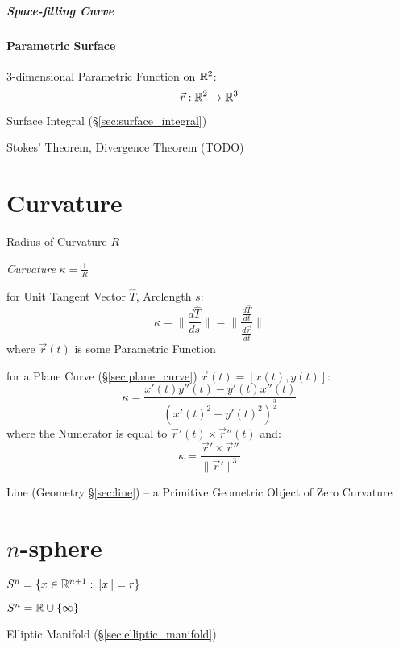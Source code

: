 \subparagraph{Space-filling Curve}\label{sec:space_filling_curve}\hfill



\paragraph{Parametric Surface}\label{sec:parametric_surface}\hfill

3-dimensional Parametric Function on
$\mathbb{R}^2$:
\[
  \vec{r} : \mathbb{R}^2 \rightarrow \mathbb{R}^3
\]

Surface Integral (\S\ref{sec:surface_integral})

Stokes' Theorem, Divergence Theorem (TODO)



\section{Curvature}\label{sec:curvature}

Radius of Curvature $R$

\emph{Curvature} $\kappa = \frac{1}{R}$

for Unit Tangent Vector $\hat{T}$, Arclength $s$:
\[
  \kappa = \|\frac{d\hat{T}}{ds}\|
    = \|\frac{\frac{d\hat{T}}{dt}}{\frac{d\vec{r}}{dt}}\|
\]
where $\vec{r}(t)$ is some Parametric Function

for a Plane Curve (\S\ref{sec:plane_curve}) $\vec{r}(t) = [x(t),y(t)]$:
\[
  \kappa = \frac{x'(t)y''(t) - y'(t)x''(t)} {(x'(t)^2 + y'(t)^2)^{\frac{3}{2}}}
\]
where the Numerator is equal to $\vec{r}'(t) \times \vec{r}''(t)$ and:
\[
  \kappa = \frac{\vec{r}' \times \vec{r}''}{\|\vec{r}'\|^3}
\]

\fist Line (Geometry \S\ref{sec:line}) -- a Primitive Geometric Object of Zero
Curvature



\section{$n$-sphere}\label{sec:n_sphere}

$S^n = \{ x \in \mathbb{R}^{n+1} : \|x\| = r \}$

$S^n = \mathbb{R} \cup \{\infty\}$

Elliptic Manifold (\S\ref{sec:elliptic_manifold})

